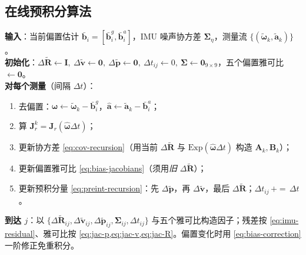 \subsection{在线预积分算法}
\label{subsec:imu-algo}

\begin{algo}\label{alg:imu-preint}
\textbf{输入}：当前偏置估计 $\bar{\mathbf b}_i=[\bar{\mathbf b}_i^g,\bar{\mathbf b}_i^a]$，IMU 噪声协方差 $\boldsymbol\Sigma_\eta$，测量流 $\{(\tilde{\boldsymbol\omega}_k,\tilde{\mathbf a}_k)\}$。\\
\textbf{初始化}：$\Delta\tilde{\mathbf R}\leftarrow\mathbf I,\ \Delta\tilde{\mathbf v}\leftarrow\mathbf 0,\ \Delta\tilde{\mathbf p}\leftarrow\mathbf 0,\ \Delta t_{ij}\leftarrow0,\ \boldsymbol\Sigma\leftarrow\mathbf 0_{9\times9}$，五个偏置雅可比 $\leftarrow\mathbf 0$。\\
\textbf{对每个测量}（间隔 $\Delta t$）：
\begin{enumerate}
  \item 去偏置：$\hat{\boldsymbol\omega}\leftarrow\tilde{\boldsymbol\omega}_k-\bar{\mathbf b}_i^g$，$\hat{\mathbf a}\leftarrow\tilde{\mathbf a}_k-\bar{\mathbf b}_i^a$；
  \item 算 $\mathbf J_r^k=\mathbf J_r(\hat{\boldsymbol\omega}\Delta t)$；
  \item 更新协方差 \cref{eq:cov-recursion}（用当前 $\Delta\tilde{\mathbf R}$ 与 $\mathrm{Exp}(\hat{\boldsymbol\omega}\Delta t)$ 构造 $\mathbf A_k,\mathbf B_k$）；
  \item 更新偏置雅可比 \cref{eq:bias-jacobians}（须用\emph{旧} $\Delta\tilde{\mathbf R}$）；
  \item 更新预积分量 \cref{eq:preint-recursion}：先 $\Delta\tilde{\mathbf p}$，再 $\Delta\tilde{\mathbf v}$，最后 $\Delta\tilde{\mathbf R}$；$\Delta t_{ij}\,{+}{=}\,\Delta t$。
\end{enumerate}
\textbf{到达 $j$}：以 $\{\Delta\tilde{\mathbf R}_{ij},\Delta\tilde{\mathbf v}_{ij},\Delta\tilde{\mathbf p}_{ij},\boldsymbol\Sigma_{ij},\Delta t_{ij}\}$ 与五个雅可比构造因子；残差按 \cref{eq:imu-residual}、雅可比按 \cref{eq:jac-p,eq:jac-v,eq:jac-R}。偏置变化时用 \cref{eq:bias-correction} 一阶修正免重积分。
\end{algo}

